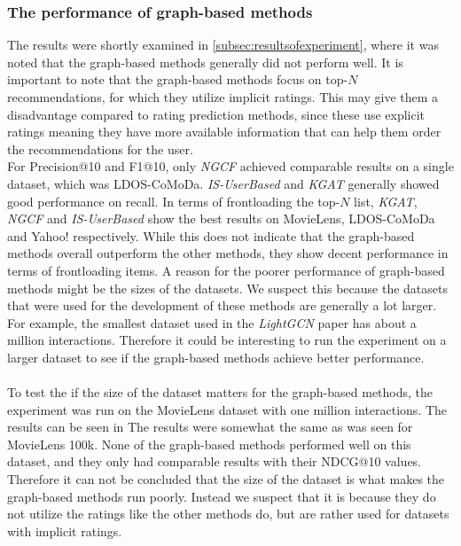 \subsubsection{The performance of graph-based methods} 
The results were shortly examined in \autoref{subsec:resultsofexperiment}, where it was noted that the graph-based methods generally did not perform well.
It is important to note that the graph-based methods focus on top-$N$ recommendations, for which they utilize implicit ratings.
This may give them a disadvantage compared to rating prediction methods, since these use explicit ratings meaning they have more available information that can help them order the recommendations for the user.
\\
For Precision@10 and F1@10, only \textit{NGCF} achieved comparable results on a single dataset, which was LDOS-CoMoDa.
\textit{IS-UserBased} and \textit{KGAT} generally showed good performance on recall.
In terms of frontloading the top-$N$ list, \textit{KGAT}, \textit{NGCF} and \textit{IS-UserBased} show the best results on MovieLens, LDOS-CoMoDa and Yahoo! respectively.
While this does not indicate that the graph-based methods overall outperform the other methods, they show decent performance in terms of frontloading items.
A reason for the poorer performance of graph-based methods might be the sizes of the datasets.
We suspect this because the datasets that were used for the development of these methods are generally a lot larger.
For example, the smallest dataset used in the \textit{LightGCN}\cite{LightGCN} paper has about a million interactions.
Therefore it could be interesting to run the experiment on a larger dataset to see if the graph-based methods achieve better performance.
\\\\
To test the if the size of the dataset matters for the graph-based methods, the experiment was run on the MovieLens dataset with one million interactions.
The results can be seen in %
The results were somewhat the same as was seen for MovieLens 100k.
None of the graph-based methods performed well on this dataset, and they only had comparable results with their NDCG@10 values.
Therefore it can not be concluded that the size of the dataset is what makes the graph-based methods run poorly. 
Instead we suspect that it is because they do not utilize the ratings like the other methods do, but are rather used for datasets with implicit ratings.